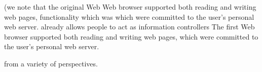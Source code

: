 \documentclass{amsart}
\begin{document}
 

  (we note that the original Web Web browser supported both reading and writing web pages, functionality which was which were committed to the user's personal web server.   already allows people to act as information controllers  The first Web browser supported both reading and writing web pages, which were committed to the user's personal web server.  






from a variety of perspectives.  %
 






\end{document}
